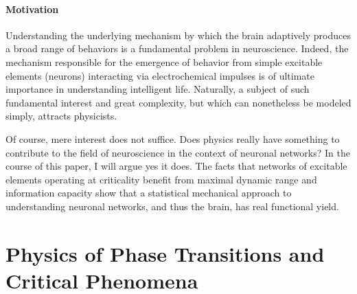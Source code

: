 \documentclass[12pt]{article}
\begin{document}
\paragraph*{Motivation}

Understanding the underlying mechanism by which the brain adaptively produces a broad range of behaviors is a fundamental problem in neuroscience. Indeed, the mechanism responsible for the emergence of behavior from simple excitable elements (neurons) interacting via electrochemical impulses is of ultimate importance in understanding intelligent life. Naturally, a subject of such fundamental interest and great complexity, but which can nonetheless be modeled simply, attracts physicists. 

Of course, mere interest does not suffice. Does physics really have something to contribute to the field of neuroscience in the context of neuronal networks? In the course of this paper, I will argue yes it does. The facts that networks of excitable elements operating at criticality benefit from maximal dynamic range \cite{Kinouchi2006b,Shew2009b} and information capacity\cite{Shew2011a} show that a statistical mechanical approach to understanding neuronal networks, and thus the brain, has real functional yield.

\section*{Physics of Phase Transitions and Critical Phenomena}
\end{document}
